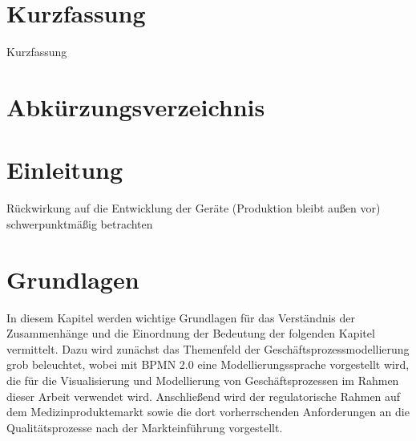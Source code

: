\documentclass[a4paper,12pt]{report}
\begin{document}
\chapter*{Kurzfassung} %

Kurzfassung

\tableofcontents %
\listoffigures %
\listoftables %
\chapter*{Abkürzungsverzeichnis} %
\begin{acronym}[XXXXX] %
\end{acronym}

\chapter{Einleitung}\label{chap:Einleitung}
Rückwirkung auf die Entwicklung der Geräte (Produktion bleibt außen vor) schwerpunktmäßig betrachten 

\chapter{Grundlagen}\label{chap:Grundlagen}
In diesem Kapitel werden wichtige Grundlagen für das Verständnis der Zusammenhänge und die Einordnung der Bedeutung der folgenden Kapitel vermittelt. Dazu wird zunächst das Themenfeld der Geschäftsprozessmodellierung grob beleuchtet, wobei mit BPMN 2.0 eine Modellierungssprache vorgestellt wird, die für die Visualisierung und Modellierung von Geschäftsprozessen im Rahmen dieser Arbeit verwendet wird. Anschließend wird der regulatorische Rahmen auf dem Medizinproduktemarkt sowie die dort vorherrschenden Anforderungen an die Qualitätsprozesse nach der Markteinführung vorgestellt.
\end{document}
